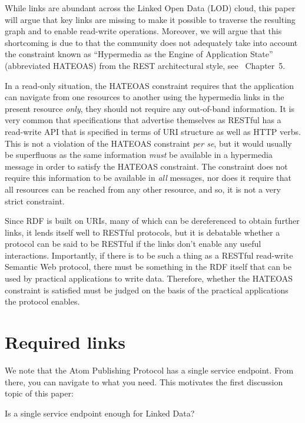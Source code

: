 \documentclass{llncs}
\begin{document}
While links are abundant across the Linked Open Data (LOD) cloud, this
paper will argue that key links are missing to make it possible to
traverse the resulting graph and to enable read-write
operations. Moreover, we will argue that this shortcoming is due to
that the community does not adequately take into account the
constraint known as ``Hypermedia as the Engine of Application State''
(abbreviated HATEOAS) from the REST architectural style, see
\cite{Fielding_2000_Architectural-Styles}~Chapter~5.

In a read-only situation, the HATEOAS constraint requires that the
application can navigate from one resources to another using the
hypermedia links in the present resource \emph{only}, they should not
require any out-of-band information. It is very common that
specifications that advertise themselves as RESTful has a read-write
API that is specified in terms of URI structure as well as HTTP
verbs. This is not a violation of the HATEOAS constraint \textit{per
  se}, but it would usually be superfluous as the same information
\emph{must} be available in a hypermedia message in order to satisfy
the HATEOAS constraint. The constraint does not require this
information to be available in \emph{all} messages, nor does it
require that all resources can be reached from any other resource, and
so, it is not a very strict constraint.



Since RDF is built on URIs, many of which can be dereferenced to
obtain further links, it lends itself well to RESTful protocols, but
it is debatable whether a protocol can be said to be RESTful if the
links don't enable any useful interactions. Importantly, if there is
to be such a thing as a RESTful read-write Semantic Web protocol,
there must be something in the RDF itself that can be used by
practical applications to write data. Therefore, whether the HATEOAS
constraint is satisfied must be judged on the basis of the practical
applications the protocol enables.

\section{Required links}

We note that the Atom Publishing Protocol\cite{atompub} has a single
service endpoint. From there, you can navigate to what you need. This
motivates the first discussion topic of this paper:

\begin{question}
Is a single service endpoint enough for Linked Data?
\end{question}
\end{document}
